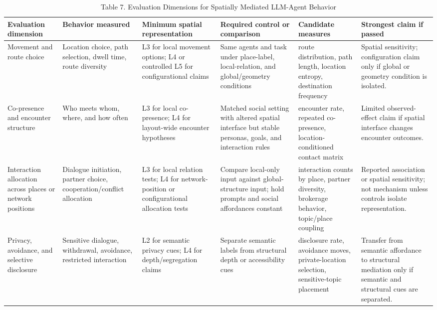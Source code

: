 \documentclass[
  twocolumn]{article}
\begin{document}
\begin{table}[t]
\centering
\caption{Table 7. Evaluation Dimensions for Spatially Mediated LLM-Agent Behavior}
\scriptsize
\setlength{\tabcolsep}{3pt}
\renewcommand{\arraystretch}{1.12}
\begin{tabular}{@{}>{\raggedright\arraybackslash}p{}|>{\raggedright\arraybackslash}p{}|>{\raggedright\arraybackslash}p{}|>{\raggedright\arraybackslash}p{}|>{\raggedright\arraybackslash}p{}|>{\raggedright\arraybackslash}p{}@{}}
\toprule
Evaluation dimension & Behavior measured & Minimum spatial representation & Required control or comparison & Candidate measures & Strongest claim if passed \\
\midrule
Movement and route choice & Location choice, path selection, dwell time, route diversity & L3 for local movement options; L4 or controlled L5 for configurational claims & Same agents and task under place-label, local-relation, and global/geometry conditions & route distribution, path length, location entropy, destination frequency & Spatial sensitivity; configuration claim only if global or geometry condition is isolated. \\
Co-presence and encounter structure & Who meets whom, where, and how often & L3 for local co-presence; L4 for layout-wide encounter hypotheses & Matched social setting with altered spatial interface but stable personas, goals, and interaction rules & encounter rate, repeated co-presence, location-conditioned contact matrix & Limited observed-effect claim if spatial interface changes encounter outcomes. \\
Interaction allocation across places or network positions & Dialogue initiation, partner choice, cooperation/conflict allocation & L3 for local relation tests; L4 for network-position or configurational allocation tests & Compare local-only input against global-structure input; hold prompts and social affordances constant & interaction counts by place, partner diversity, brokerage behavior, topic/place coupling & Reported association or spatial sensitivity; not mechanism unless controls isolate representation. \\
Privacy, avoidance, and selective disclosure & Sensitive dialogue, withdrawal, avoidance, restricted interaction & L2 for semantic privacy cues; L4 for depth/segregation claims & Separate semantic labels from structural depth or accessibility cues & disclosure rate, avoidance moves, private-location selection, sensitive-topic placement & Transfer from semantic affordance to structural mediation only if semantic and structural cues are separated. \\

\end{tabular}
\end{table}
\end{document}
